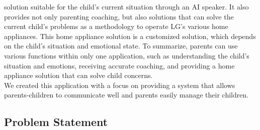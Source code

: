 \documentclass[conference]{IEEEtran}
\begin{document}
solution suitable for the child's current situation through an AI speaker. It also provides not only parenting coaching, but also solutions that can solve the current child's problems as a methodology to operate LG's various home appliances. This home appliance solution is a customized solution, which depends on the child's situation and emotional state. To summarize, parents can use various functions within only one application, such as understanding the child's situation and emotions, receiving accurate coaching, and providing a home appliance solution that can solve child concerns.\\We created this application with a focus on providing a system that allows parents-children to communicate well and parents easily manage their children.

\subsection{\large{Problem Statement}}
\end{document}
